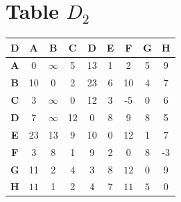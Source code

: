 \documentclass{article}
\begin{document}
\section{Table $D_{2}$}
\begin{center}
    \begin{tabular}{|c||c|c|c|c|c|c|c|c|}
        \hline
        \textbf{D} & \textbf{A} & \textbf{B} & \textbf{C} & \textbf{D} & \textbf{E} & \textbf{F} & \textbf{G} & \textbf{H} \\
        \hline
        \hline
        \textbf{A}& 0 & $\infty$ & 5 & 13 & 1 & 2 & 5 & 9 \\
        \hline
        \textbf{B}& 10 & 0 & 2 & 23 & 6 & 10 & 4 & 7 \\
        \hline
        \textbf{C}& 3 & $\infty$ & 0 & 12 & 3 & -5 & 0 & 6 \\
        \hline
        \textbf{D}& 7 & $\infty$ & 12 & 0 & 8 & 9 & 8 & 5 \\
        \hline
        \textbf{E}& \cellcolor[HTML]{D74894}$23$ & 13 & 9 & 10 & 0 & 12 & 1 & 7 \\
        \hline
        \textbf{F}& 3 & 8 & 1 & 9 & 2 & 0 & 8 & -3 \\
        \hline
        \textbf{G}& 11 & 2 & \cellcolor[HTML]{D74894}$4$ & 3 & \cellcolor[HTML]{D74894}$8$ & \cellcolor[HTML]{D74894}$12$ & 0 & 9 \\
        \hline
        \textbf{H}& \cellcolor[HTML]{D74894}$11$ & 1 & 2 & 4 & \cellcolor[HTML]{D74894}$7$ & \cellcolor[HTML]{D74894}$11$ & \cellcolor[HTML]{D74894}$5$ & 0 \\
        \hline
    \end{tabular}
\end{center}
\end{document}
